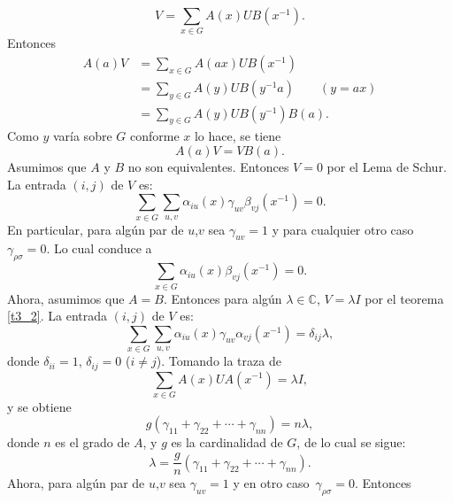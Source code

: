 \documentclass[12pt]{book}
\theoremstyle{definition}
\newcounter{in}
\begin{document}
\begin{equation}
  \label{eq:22}
  V=\sum_{x \in G} A(x)UB(x^{-1}).  
\end{equation}
Entonces
\begin{equation}
  \label{eq:23}
  \begin{aligned}
    A(a)V &=\sum_{x \in G} A(ax)UB(x^{-1})\\
    &=\sum_{y \in G} A(y)UB(y^{-1}a) \qquad (y=ax)\\
    &=\sum_{y \in G} A(y)UB(y^{-1})B(a).
  \end{aligned}
\end{equation}
Como $y$ varía sobre $G$ conforme $x$ lo hace, se tiene
\begin{equation}
  \label{eq:24}
  A(a)V=VB(a).
\end{equation} 
Asumimos que $A$ y $B$ no son equivalentes. Entonces $V=0$ por el Lema
de Schur. La entrada $(i,j)$ de $V$ es:
\begin{equation}
  \label{eq:25}
  \sum_{x \in G} \sum_{u,v} \alpha_{iu}(x) \gamma_{uv} \beta_{vj}(x^{-1}) = 0.
\end{equation}
En particular, para algún par de $u$,$v$ sea $\gamma_{uv}=1$ y para
cualquier otro caso~$\gamma_{\rho \sigma}=0$. Lo cual conduce a
\begin{equation}
  \label{eq:26}
  \sum_{x \in G} \alpha_{iu}(x) \beta_{vj}(x^{-1}) = 0.
\end{equation}
Ahora, asumimos que $A=B$. Entonces para algún
$\lambda \in \mathbb{C}$, $V=\lambda I$ por el teorema \ref{t3_2}. La
entrada $(i,j)$ de $V$ es:
\begin{equation}
  \label{eq:27}
   \sum_{x \in G} \sum_{u,v} \alpha_{iu}(x) \gamma_{uv} \alpha_{vj}(x^{-1}) = \delta_{ij}\lambda,
\end{equation}
donde $\delta_{ii}=1$, $\delta_{ij}=0$ ($i \neq j$). Tomando la traza de
\begin{equation}
  \label{eq:28}
  \sum_{x \in G} A(x)UA(x^{-1}) = \lambda I,
\end{equation}
y se obtiene
\begin{equation}
  \label{eq:29}
  g(\gamma_{11}+\gamma_{22}+ \cdots +\gamma_{nn})=n \lambda,
\end{equation}
donde $n$ es el grado de $A$, y $g$ es la cardinalidad de $G$, de lo cual se sigue:
\begin{equation}
  \label{eq:30}
  \lambda=\frac{g}{n}(\gamma_{11}+\gamma_{22}+ \cdots + \gamma_{nn}).
\end{equation}
Ahora, para algún par de $u$,$v$ sea $\gamma_{uv}=1$ y en otro caso~$\gamma_{\rho \sigma}=0$. Entonces
\end{document}
